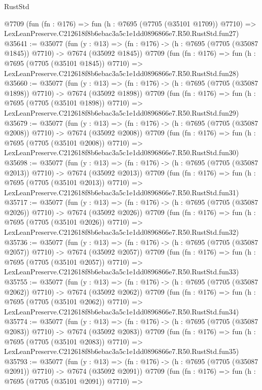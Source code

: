 \begin{lexlean}{RustStd}
\begin{coremodule}
    @7709
    (fun (fn : @176) =>
    fun (h : @7695 (@7705 (@35101 @1709)) @7710) =>
    LexLeanPreserve.C212618f8b6ebac3a5c1e1dd0896866e7.R50.RustStd.fun27)
@35641 := @35077
    (fun (y : @13) =>
    (fn : @176) -> (h : @7695 (@7705 (@35087 @1845)) @7710) -> @7674 (@35092 @1845))
    @7709
    (fun (fn : @176) =>
    fun (h : @7695 (@7705 (@35101 @1845)) @7710) =>
    LexLeanPreserve.C212618f8b6ebac3a5c1e1dd0896866e7.R50.RustStd.fun28)
@35660 := @35077
    (fun (y : @13) =>
    (fn : @176) -> (h : @7695 (@7705 (@35087 @1898)) @7710) -> @7674 (@35092 @1898))
    @7709
    (fun (fn : @176) =>
    fun (h : @7695 (@7705 (@35101 @1898)) @7710) =>
    LexLeanPreserve.C212618f8b6ebac3a5c1e1dd0896866e7.R50.RustStd.fun29)
@35679 := @35077
    (fun (y : @13) =>
    (fn : @176) -> (h : @7695 (@7705 (@35087 @2008)) @7710) -> @7674 (@35092 @2008))
    @7709
    (fun (fn : @176) =>
    fun (h : @7695 (@7705 (@35101 @2008)) @7710) =>
    LexLeanPreserve.C212618f8b6ebac3a5c1e1dd0896866e7.R50.RustStd.fun30)
@35698 := @35077
    (fun (y : @13) =>
    (fn : @176) -> (h : @7695 (@7705 (@35087 @2013)) @7710) -> @7674 (@35092 @2013))
    @7709
    (fun (fn : @176) =>
    fun (h : @7695 (@7705 (@35101 @2013)) @7710) =>
    LexLeanPreserve.C212618f8b6ebac3a5c1e1dd0896866e7.R50.RustStd.fun31)
@35717 := @35077
    (fun (y : @13) =>
    (fn : @176) -> (h : @7695 (@7705 (@35087 @2026)) @7710) -> @7674 (@35092 @2026))
    @7709
    (fun (fn : @176) =>
    fun (h : @7695 (@7705 (@35101 @2026)) @7710) =>
    LexLeanPreserve.C212618f8b6ebac3a5c1e1dd0896866e7.R50.RustStd.fun32)
@35736 := @35077
    (fun (y : @13) =>
    (fn : @176) -> (h : @7695 (@7705 (@35087 @2057)) @7710) -> @7674 (@35092 @2057))
    @7709
    (fun (fn : @176) =>
    fun (h : @7695 (@7705 (@35101 @2057)) @7710) =>
    LexLeanPreserve.C212618f8b6ebac3a5c1e1dd0896866e7.R50.RustStd.fun33)
@35755 := @35077
    (fun (y : @13) =>
    (fn : @176) -> (h : @7695 (@7705 (@35087 @2062)) @7710) -> @7674 (@35092 @2062))
    @7709
    (fun (fn : @176) =>
    fun (h : @7695 (@7705 (@35101 @2062)) @7710) =>
    LexLeanPreserve.C212618f8b6ebac3a5c1e1dd0896866e7.R50.RustStd.fun34)
@35774 := @35077
    (fun (y : @13) =>
    (fn : @176) -> (h : @7695 (@7705 (@35087 @2083)) @7710) -> @7674 (@35092 @2083))
    @7709
    (fun (fn : @176) =>
    fun (h : @7695 (@7705 (@35101 @2083)) @7710) =>
    LexLeanPreserve.C212618f8b6ebac3a5c1e1dd0896866e7.R50.RustStd.fun35)
@35793 := @35077
    (fun (y : @13) =>
    (fn : @176) -> (h : @7695 (@7705 (@35087 @2091)) @7710) -> @7674 (@35092 @2091))
    @7709
    (fun (fn : @176) =>
    fun (h : @7695 (@7705 (@35101 @2091)) @7710) =>

\end{coremodule}
\end{lexlean}
